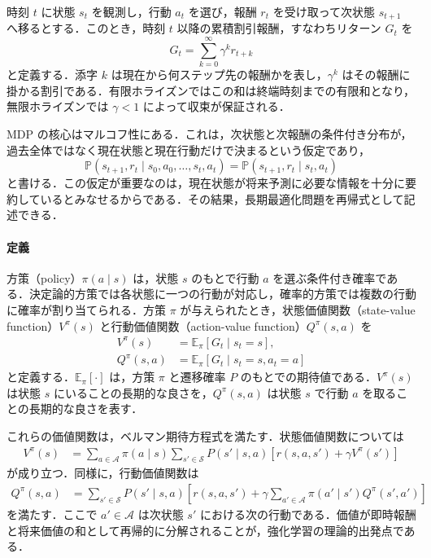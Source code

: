 時刻 $t$ に状態 $s_t$ を観測し，行動 $a_t$ を選び，報酬 $r_t$ を受け取って次状態 $s_{t+1}$ へ移るとする．このとき，時刻 $t$ 以降の累積割引報酬，すなわちリターン $G_t$ を
\begin{equation*}
G_t = \sum_{k=0}^{\infty} \gamma^k r_{t+k}
\end{equation*}
と定義する．添字 $k$ は現在から何ステップ先の報酬かを表し，$\gamma^k$ はその報酬に掛かる割引である．有限ホライズンではこの和は終端時刻までの有限和となり，無限ホライズンでは $\gamma < 1$ によって収束が保証される．

MDP の核心はマルコフ性にある．これは，次状態と次報酬の条件付き分布が，過去全体ではなく現在状態と現在行動だけで決まるという仮定であり，
\begin{equation*}
\mathbb{P}(s_{t+1},r_t \mid s_0,a_0,\ldots,s_t,a_t)
=
\mathbb{P}(s_{t+1},r_t \mid s_t,a_t)
\end{equation*}
と書ける．この仮定が重要なのは，現在状態が将来予測に必要な情報を十分に要約しているとみなせるからである．その結果，長期最適化問題を再帰式として記述できる．

\paragraph*{定義}
方策（policy）$\pi(a \mid s)$ は，状態 $s$ のもとで行動 $a$ を選ぶ条件付き確率である．決定論的方策では各状態に一つの行動が対応し，確率的方策では複数の行動に確率が割り当てられる．方策 $\pi$ が与えられたとき，状態価値関数（state-value function）$V^\pi(s)$ と行動価値関数（action-value function）$Q^\pi(s,a)$ を
\begin{align*}
V^\pi(s) &= \mathbb{E}_\pi[G_t \mid s_t=s], \\
Q^\pi(s,a) &= \mathbb{E}_\pi[G_t \mid s_t=s, a_t=a]
\end{align*}
と定義する．$\mathbb{E}_\pi[\cdot]$ は，方策 $\pi$ と遷移確率 $P$ のもとでの期待値である．$V^\pi(s)$ は状態 $s$ にいることの長期的な良さを，$Q^\pi(s,a)$ は状態 $s$ で行動 $a$ を取ることの長期的な良さを表す．

これらの価値関数は，ベルマン期待方程式を満たす．状態価値関数については
\begin{align*}
V^\pi(s)
&=
\sum_{a \in \mathcal{A}} \pi(a \mid s)
\sum_{s' \in \mathcal{S}} P(s' \mid s,a)
\left[
r(s,a,s') + \gamma V^\pi(s')
\right]
\end{align*}
が成り立つ．同様に，行動価値関数は
\begin{align*}
Q^\pi(s,a)
&=
\sum_{s' \in \mathcal{S}} P(s' \mid s,a)
\left[
r(s,a,s') + \gamma \sum_{a' \in \mathcal{A}} \pi(a' \mid s') Q^\pi(s',a')
\right]
\end{align*}
を満たす．ここで $a' \in \mathcal{A}$ は次状態 $s'$ における次の行動である．価値が即時報酬と将来価値の和として再帰的に分解されることが，強化学習の理論的出発点である．

